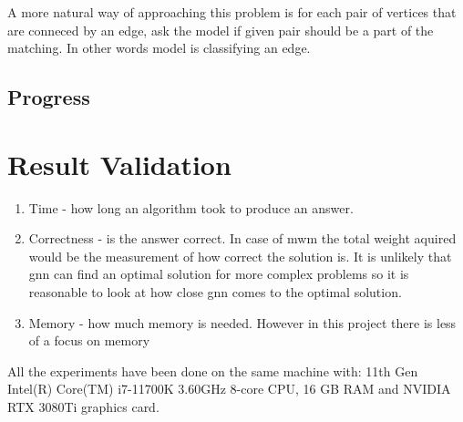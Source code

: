 A more natural way of approaching this problem is for each pair of vertices that are conneced by an edge, ask the model if given pair should be a part of the matching. In other words model is classifying an edge. 

\subsection{Progress}

\section{Result Validation}

\begin{enumerate}
\item Time - how long an algorithm took to produce an answer.
\item Correctness - is the answer correct. In case of \gls{mwm} the total weight aquired would be the measurement of how correct the solution is. It is unlikely that \gls{gnn} can find an optimal solution for more complex problems so it is reasonable to look at how close \gls{gnn} comes to the optimal solution.
\item Memory - how much memory is needed. However in this project there is less of a focus on memory
\end{enumerate}

All the experiments have been done on the same machine with: 11th Gen Intel(R) Core(TM) i7-11700K 3.60GHz 8-core CPU, 16 GB RAM and NVIDIA RTX 3080Ti graphics card.


